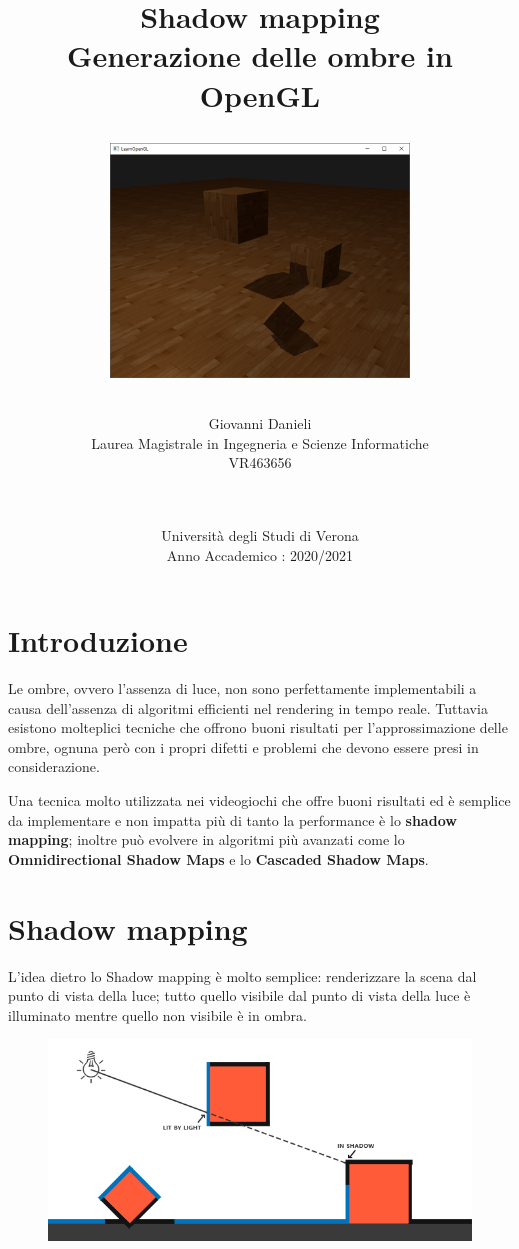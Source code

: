 \documentclass[12pt]{report}
\title{\textbf{Shadow mapping} \\
    \large Generazione delle ombre in OpenGL
    \begin{figure}[H]
  \centering
    \includegraphics[width=300]{img/copertina_temp.png}
\end{figure}
}
\author{Giovanni Danieli\\
        Laurea Magistrale in Ingegneria e Scienze Informatiche\\
        VR463656\\
            \and
            \\
            \\
        Università degli Studi di Verona\\
        Anno Accademico : 2020/2021
}
\begin{document}
\addtolength{\topmargin}{-30mm}
\thispagestyle{empty}
\date{}
\maketitle
{}
\hypersetup{linkcolor  = black}
\tableofcontents
\thispagestyle{empty}
\addtolength{\topmargin}{15mm}
\setlength{\parskip}{1em}

\addtolength{\topmargin}{15mm}
\chapter{Introduzione}

Le ombre, ovvero l'assenza di luce, non sono perfettamente implementabili a causa dell'assenza di algoritmi efficienti nel rendering in tempo reale. Tuttavia esistono molteplici tecniche che offrono buoni risultati per l'approssimazione delle ombre, ognuna però con i propri difetti e problemi che devono essere presi in considerazione.

Una tecnica molto utilizzata nei videogiochi che offre buoni risultati ed è semplice da implementare e non impatta più di tanto la performance è lo \textbf{shadow mapping}; inoltre può evolvere in algoritmi più avanzati come lo \textbf{Omnidirectional Shadow Maps} e lo \textbf{Cascaded Shadow Maps}.

\chapter{Shadow mapping}
L’idea dietro lo Shadow mapping è molto semplice: renderizzare la scena dal punto di vista della luce; tutto quello visibile dal punto di vista della luce è illuminato mentre quello non visibile è in ombra.

\begin{figure}[H]
  \centering
    \includegraphics[width=1.0\textwidth]{img/shadow_mapping_theory.png}
\end{figure}
 
\end{document}
